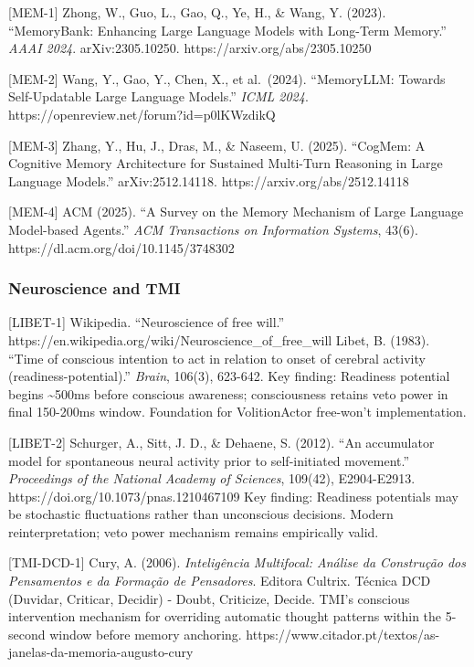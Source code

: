 \documentclass[
]{article}
\begin{document}
{[}MEM-1{]} Zhong, W., Guo, L., Gao, Q., Ye, H., \& Wang, Y. (2023).
``MemoryBank: Enhancing Large Language Models with Long-Term Memory.''
\emph{AAAI 2024}. arXiv:2305.10250. https://arxiv.org/abs/2305.10250

{[}MEM-2{]} Wang, Y., Gao, Y., Chen, X., et al.~(2024). ``MemoryLLM:
Towards Self-Updatable Large Language Models.'' \emph{ICML 2024}.
https://openreview.net/forum?id=p0lKWzdikQ

{[}MEM-3{]} Zhang, Y., Hu, J., Dras, M., \& Naseem, U. (2025). ``CogMem:
A Cognitive Memory Architecture for Sustained Multi-Turn Reasoning in
Large Language Models.'' arXiv:2512.14118.
https://arxiv.org/abs/2512.14118

{[}MEM-4{]} ACM (2025). ``A Survey on the Memory Mechanism of Large
Language Model-based Agents.'' \emph{ACM Transactions on Information
Systems}, 43(6). https://dl.acm.org/doi/10.1145/3748302

\hypertarget{neuroscience-and-tmi}{%
\subsubsection{Neuroscience and TMI}\label{neuroscience-and-tmi}}

{[}LIBET-1{]} Wikipedia. ``Neuroscience of free will.''
https://en.wikipedia.org/wiki/Neuroscience\_of\_free\_will Libet, B.
(1983). ``Time of conscious intention to act in relation to onset of
cerebral activity (readiness-potential).'' \emph{Brain}, 106(3),
623-642. Key finding: Readiness potential begins \textasciitilde500ms
before conscious awareness; consciousness retains veto power in final
150-200ms window. Foundation for VolitionActor free-won't
implementation.

{[}LIBET-2{]} Schurger, A., Sitt, J. D., \& Dehaene, S. (2012). ``An
accumulator model for spontaneous neural activity prior to
self-initiated movement.'' \emph{Proceedings of the National Academy of
Sciences}, 109(42), E2904-E2913. https://doi.org/10.1073/pnas.1210467109
Key finding: Readiness potentials may be stochastic fluctuations rather
than unconscious decisions. Modern reinterpretation; veto power
mechanism remains empirically valid.

{[}TMI-DCD-1{]} Cury, A. (2006). \emph{Inteligência Multifocal: Análise
da Construção dos Pensamentos e da Formação de Pensadores}. Editora
Cultrix. Técnica DCD (Duvidar, Criticar, Decidir) - Doubt, Criticize,
Decide. TMI's conscious intervention mechanism for overriding automatic
thought patterns within the 5-second window before memory anchoring.
https://www.citador.pt/textos/as-janelas-da-memoria-augusto-cury
\end{document}
